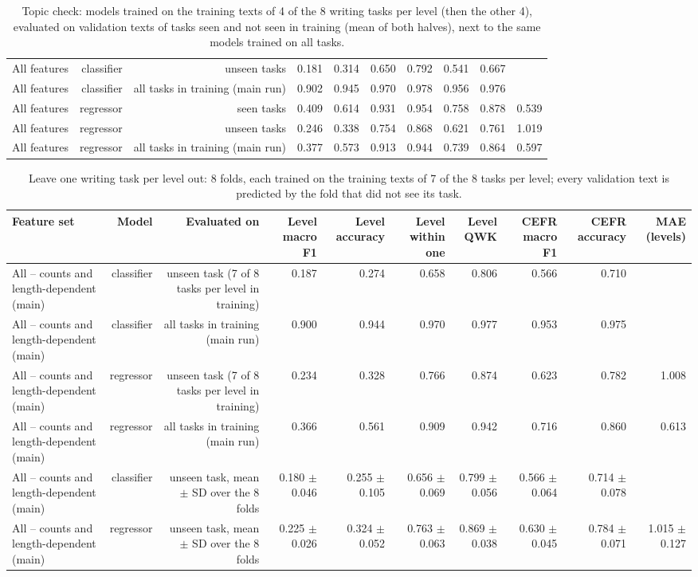 \begin{table}[t]
\begin{tabular}{lrrrrrrrrr}
All features & classifier & unseen tasks & 0.181 & 0.314 & 0.650 & 0.792 & 0.541 & 0.667 &  \\
All features & classifier & all tasks in training (main run) & 0.902 & 0.945 & 0.970 & 0.978 & 0.956 & 0.976 &  \\
All features & regressor & seen tasks & 0.409 & 0.614 & 0.931 & 0.954 & 0.758 & 0.878 & 0.539 \\
All features & regressor & unseen tasks & 0.246 & 0.338 & 0.754 & 0.868 & 0.621 & 0.761 & 1.019 \\
All features & regressor & all tasks in training (main run) & 0.377 & 0.573 & 0.913 & 0.944 & 0.739 & 0.864 & 0.597 \\
\bottomrule
\end{tabular}
\caption{Topic check: models trained on the training texts of 4 of the 8 writing tasks per level (then the other 4), evaluated on validation texts of tasks seen and not seen in training (mean of both halves), next to the same models trained on all tasks.}
\label{tab:table_9_topic_check}
\end{table}

\begin{table}[t]
\centering
\small
\begin{tabular}{lrrrrrrrrr}
\toprule
Feature set & Model & Evaluated on & Level macro F1 & Level accuracy & Level within one & Level QWK & CEFR macro F1 & CEFR accuracy & MAE (levels) \\
\midrule
All -- counts and length-dependent (main) & classifier & unseen task (7 of 8 tasks per level in training) & 0.187 & 0.274 & 0.658 & 0.806 & 0.566 & 0.710 &  \\
All -- counts and length-dependent (main) & classifier & all tasks in training (main run) & 0.900 & 0.944 & 0.970 & 0.977 & 0.953 & 0.975 &  \\
All -- counts and length-dependent (main) & regressor & unseen task (7 of 8 tasks per level in training) & 0.234 & 0.328 & 0.766 & 0.874 & 0.623 & 0.782 & 1.008 \\
All -- counts and length-dependent (main) & regressor & all tasks in training (main run) & 0.366 & 0.561 & 0.909 & 0.942 & 0.716 & 0.860 & 0.613 \\
All -- counts and length-dependent (main) & classifier & unseen task, mean $\pm$ SD over the 8 folds & 0.180 $\pm$ 0.046 & 0.255 $\pm$ 0.105 & 0.656 $\pm$ 0.069 & 0.799 $\pm$ 0.056 & 0.566 $\pm$ 0.064 & 0.714 $\pm$ 0.078 &  \\
All -- counts and length-dependent (main) & regressor & unseen task, mean $\pm$ SD over the 8 folds & 0.225 $\pm$ 0.026 & 0.324 $\pm$ 0.052 & 0.763 $\pm$ 0.063 & 0.869 $\pm$ 0.038 & 0.630 $\pm$ 0.045 & 0.784 $\pm$ 0.071 & 1.015 $\pm$ 0.127 \\
\bottomrule
\end{tabular}
\caption{Leave one writing task per level out: 8 folds, each trained on the training texts of 7 of the 8 tasks per level; every validation text is predicted by the fold that did not see its task.}
\label{tab:table_10_leave_one_task_out}
\end{table}

